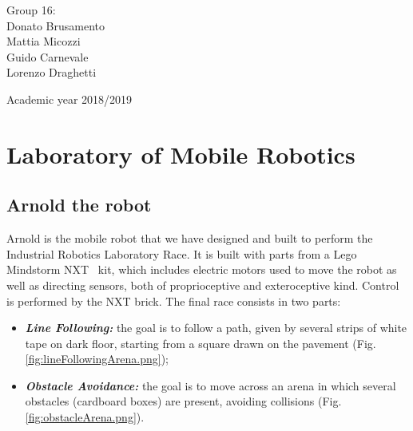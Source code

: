 \documentclass[a4paper,11pt,oneside]{book}
\begin{document}
			\begin{flushright}
				{\large Group 16:\\
					Donato Brusamento\\
						Mattia Micozzi\\
						Guido Carnevale\\
						Lorenzo Draghetti\\}

			\end{flushright}
			\begin{center}
			\vfill
			      {\large Academic year \@2018/2019} \\
			\end{center}
			
			
			
			\newpage
			\thispagestyle{empty}
			
			
			
			\tableofcontents \thispagestyle{empty}
			\listoffigures\thispagestyle{empty}
			
			
			
			\chapter{Laboratory of Mobile Robotics}
			
			\section*{Arnold the robot}
			
			Arnold is the mobile robot that we have designed and built to perform the Industrial Robotics Laboratory Race. It is built with parts from a Lego Mindstorm NXT\textregistered ~ kit, which includes electric motors used to move the robot as well as directing sensors, both of proprioceptive and exteroceptive kind. Control is performed by the NXT brick. The final race consists in two parts:
			\begin{itemize}                          
				\item \textit{\textbf {Line Following:}} the goal is to follow a path, given by several strips of white tape on dark floor, starting from a square drawn on the pavement (Fig.\ref{fig:lineFollowingArena.png});
				
				\item \textit{\textbf {Obstacle Avoidance:}} the goal is to move across an arena in which several obstacles (cardboard boxes) are present, avoiding collisions (Fig.\ref{fig:obstacleArena.png}).
			
			\end{itemize}
		
\end{document}
